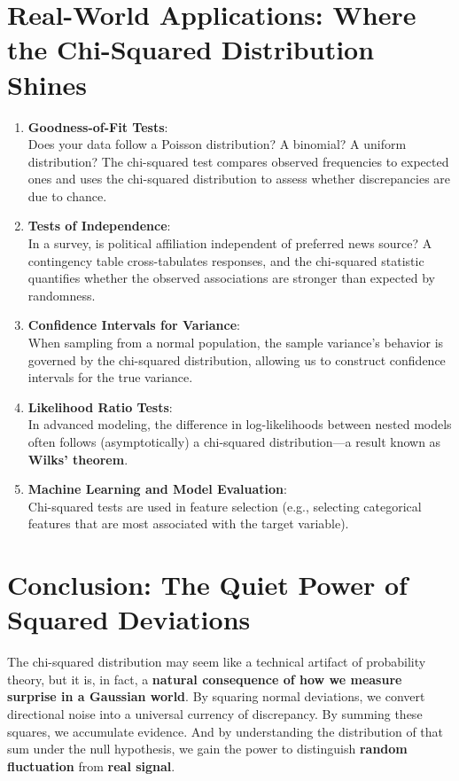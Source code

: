 \documentclass[12pt]{article}
\begin{document}
\section*{Real-World Applications: Where the Chi-Squared Distribution Shines}

\begin{enumerate}
    \item \textbf{Goodness-of-Fit Tests}: \\
    Does your data follow a Poisson distribution? A binomial? A uniform distribution? The chi-squared test compares observed frequencies to expected ones and uses the chi-squared distribution to assess whether discrepancies are due to chance.

    \item \textbf{Tests of Independence}: \\
    In a survey, is political affiliation independent of preferred news source? A contingency table cross-tabulates responses, and the chi-squared statistic quantifies whether the observed associations are stronger than expected by randomness.

    \item \textbf{Confidence Intervals for Variance}: \\
    When sampling from a normal population, the sample variance’s behavior is governed by the chi-squared distribution, allowing us to construct confidence intervals for the true variance.

    \item \textbf{Likelihood Ratio Tests}: \\
    In advanced modeling, the difference in log-likelihoods between nested models often follows (asymptotically) a chi-squared distribution—a result known as \textbf{Wilks’ theorem}.

    \item \textbf{Machine Learning and Model Evaluation}: \\
    Chi-squared tests are used in feature selection (e.g., selecting categorical features that are most associated with the target variable).
\end{enumerate}

\section*{Conclusion: The Quiet Power of Squared Deviations}

The chi-squared distribution may seem like a technical artifact of probability theory, but it is, in fact, a \textbf{natural consequence of how we measure surprise in a Gaussian world}. By squaring normal deviations, we convert directional noise into a universal currency of discrepancy. By summing these squares, we accumulate evidence. And by understanding the distribution of that sum under the null hypothesis, we gain the power to distinguish \textbf{random fluctuation} from \textbf{real signal}.
\end{document}
